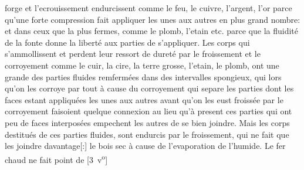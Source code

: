 forge\protect{} et l'ecrouissement endurcissent
comme le feu\protect{}, le cuivre,\protect{} l'argent\protect{}, l'or parce qu'une forte compression\protect{} fait appliquer les unes aux autres en plus grand nombre: et dans ceux que la
plus fermes, comme le plomb\protect{}, l'etain\protect{} etc. parce que la fluidit\'{e} de la fonte donne la libert\'{e} aux parties de s'appliquer. Les corps qui s'ammollissent et perdent leur ressort\protect{} de \protect{}duret\'{e} par le froissement\protect{} et le corroyement\protect{} comme le cuir\protect{}, la cire\protect{}, la terre\protect{} grosse, l'etain\protect{}, le \protect{}plomb, ont une grande
des parties fluides remferm\'{e}es dans des intervalles spongieux, qui lors qu'on les corroye
par tout \`{a} cause du corroyement\protect{} qui separe les parties dont les faces estant appliqu\'{e}es les unes aux autres avant qu'on les eust froiss\'{e}e par le corroyement\protect{} faisoient quelque connexion au lieu qu'\`{a} present ces parties qui ont peu de faces interpos\'{e}es empechent les autres de se bien joindre.
Mais les corps destitués de ces parties fluides, sont endurcis par le froissement,\protect{}
qui ne fait que les joindre davantage[:]
%
le bois sec
%
\`{a} cause de l'evaporation\protect{} de l'humide. Le fer\protect{} chaud ne fait point de
%
[3~v\textsuperscript{o}]
